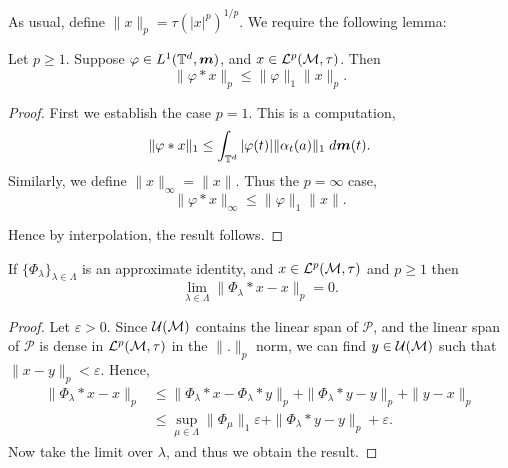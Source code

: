As usual, define $\|x\|_p = \tau(|x|^p)^{1/p}$. We require the following lemma:
\begin{lemma}
    Let $p \geq 1$. Suppose $\varphi \in L^1(\mathbb{T}^d,\boldsymbol{m})$, and $x \in \mathcal{L}^p(\mathcal{M},\tau)$. Then
    \begin{equation}
        \|\varphi*x\|_p \leq \|\varphi\|_1\|x\|_p.
    \end{equation}
\end{lemma} 
\begin{proof}
    First we establish the case $p  =  1$. This is a computation,
    \begin{equation}
        \|\varphi * x\|_1 \leq \int_{\mathbb{T}^d} |\varphi(t)|\|\alpha_{t}(a)\|_1\;d\boldsymbol{m}(t).
    \end{equation}
    Similarly, we define $\|x\|_\infty = \|x\|$. Thus the $p = \infty$ case,
    \begin{equation}
        \|\varphi*x\|_\infty \leq \|\varphi\|_1\|x\|.
    \end{equation}
    
    Hence by interpolation, the result follows.
\end{proof} 


\begin{proposition}
     If $\{\Phi_\lambda\}_{\lambda \in \Lambda}$
    is an approximate identity, and $x \in \mathcal{L}^p(\mathcal{M},\tau)$
    and $p \geq 1$
    then
    \begin{equation}
        \lim_{\lambda \in \Lambda}\|\Phi_\lambda*x-x\|_p = 0.
    \end{equation}    
\end{proposition}
\begin{proof}
    Let $\varepsilon > 0$.
    Since $\mathcal{U}(\mathcal{M})$ contains the linear span of $\mathcal{P}$,
    and the linear span of $\mathcal{P}$ is dense in $\mathcal{L}^p(\mathcal{M},\tau)$
    in the $\|.\|_p$ norm, we can find $y \in \mathcal{U}(\mathcal{M})$ such
    that $\|x-y\|_p < \varepsilon$. Hence,
    \begin{align}
        \|\Phi_\lambda*x-x\|_p &\leq \|\Phi_\lambda*x-\Phi_\lambda*y\|_p + \|\Phi_\lambda*y-y\|_p + \|y-x\|_p\\
        &\leq \sup_{\mu \in \Lambda} \|\Phi_\mu\|_1\varepsilon + \|\Phi_\lambda*y-y\|_p + \varepsilon.
    \end{align}
    Now take the limit over $\lambda$, and thus we obtain the result.
\end{proof}

